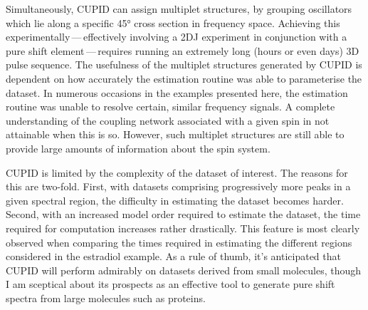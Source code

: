 Simultaneously, \ac{CUPID} can assign multiplet structures,
by grouping oscillators which lie along a specific \ang{45} cross section in
frequency space. Achieving this experimentally\,---\,effectively involving
a \ac{2DJ} experiment in conjunction with a pure shift element\,---\,requires
running an extremely long (hours or even days) \ac{3D} pulse sequence. The
usefulness of
the multiplet structures generated by \ac{CUPID} is dependent on how accurately
the estimation routine was able to parameterise the dataset. In numerous
occasions in the examples presented here, the estimation routine was unable to
resolve certain, similar frequency signals. A complete understanding of the
coupling network associated with a given spin in not attainable when this is
so. However, such multiplet structures are still able to provide large amounts
of information about the spin system.

\ac{CUPID} is limited by the complexity of the dataset of interest. The reasons
for this are two-fold. First, with datasets comprising progressively more peaks
in a given spectral region, the difficulty in estimating the dataset becomes
harder. Second, with an increased model order required to estimate the dataset,
the time required for computation increases rather drastically. This feature is
most clearly observed when comparing the times required in estimating the
different regions considered in the estradiol example. As a rule of thumb, it's
anticipated that \ac{CUPID} will perform admirably on datasets derived from
small molecules, though I am sceptical about its prospects as an effective
tool to generate pure shift spectra from large molecules such as proteins.
